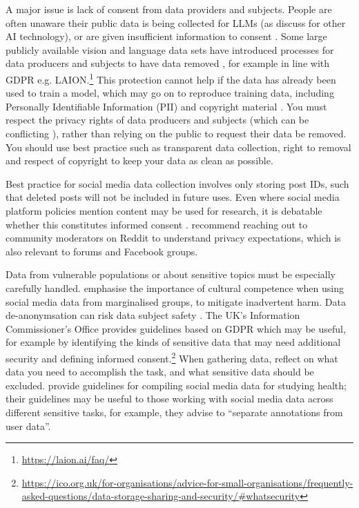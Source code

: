 A major issue is lack of consent from data providers and subjects. People are often unaware their public data is being collected for LLMs \citep{kim_propile_2023} (as \citet{scheuerman_human_2023, meng_owning_2021} discuss for other AI technology), or are given insufficient information to consent \citep{winograd_loose-lipped_2022, xiao_bad_2020}. Some large publicly available vision and language data sets have introduced processes for data producers and subjects to have data removed \citep{heikkila_artists_2022}, for example in line with GDPR e.g. LAION.\footnote{\url{https://laion.ai/faq/}} This protection cannot help if the data has already been used to train a model, which may go on to reproduce training data, including Personally Identifiable Information (PII) \citep{lukas_analyzing_2023} and copyright material \citep{karamolegkou_copyright_2023}. You must respect the privacy rights of data producers and subjects (which can be conflicting \citep{kekulluoglu_preserving_2018}), rather than relying on the public to request their data be removed. You should use best practice such as transparent data collection, right to removal and respect of copyright to keep your data as clean as possible.

Best practice for social media data collection involves only storing post IDs, such that deleted posts will not be included in future uses. Even where social media platform policies mention content may be used for research, it is debatable whether this constitutes informed consent \citep{fiesler_remember_2024}. \citet{fiesler_remember_2024} recommend reaching out to community moderators on Reddit to understand privacy expectations, which is also relevant to forums and Facebook groups. \citet{mancosu_what_2020}


Data from vulnerable populations or about sensitive topics must be especially carefully handled. \citet{klassen_this_2022} emphasise the importance of cultural competence when using social media data from marginalised groups, to mitigate inadvertent harm. Data de-anonymsation can risk data subject safety \citep{rocher_estimating_2019}. The UK's Information Commissioner's Office provides guidelines based on GDPR which may be useful, for example by identifying the kinds of sensitive data that may need additional security and defining informed consent.\footnote{\url{https://ico.org.uk/for-organisations/advice-for-small-organisations/frequently-asked-questions/data-storage-sharing-and-security/\#whatsecurity}} When gathering data, reflect on what data you need to accomplish the task, and what sensitive data should be excluded. 
\citet{benton_ethical_2017} provide guidelines for compiling social media data for studying health; their guidelines may be useful to those working with social media data across different sensitive tasks, for example, they advise to ``separate annotations from user data''.

